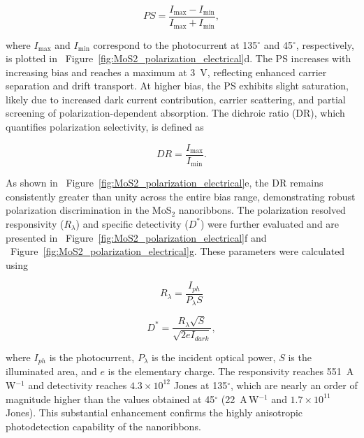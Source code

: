 \documentclass[journal=jacsnano,manuscript=article]{achemso}
\begin{document}
\begin{equation}
PS = \frac{I_{\max} - I_{\min}}{I_{\max} + I_{\min}},
\end{equation}

\noindent
where $I_{\max}$ and $I_{\min}$ correspond to the photocurrent at 135$^\circ$ and 45$^\circ$, respectively, is plotted in ~Figure~\ref{fig:MoS2_polarization_electrical}d. The PS increases with increasing bias and reaches a maximum at 3~V, reflecting enhanced carrier separation and drift transport. At higher bias, the PS exhibits slight saturation, likely due to increased dark current contribution, carrier scattering, and partial screening of polarization-dependent absorption.
The dichroic ratio (DR), which quantifies polarization selectivity, is defined as

\begin{equation}
DR = \frac{I_{\max}}{I_{\min}}.
\end{equation}

\noindent
As shown in ~Figure~\ref{fig:MoS2_polarization_electrical}e, the DR remains consistently greater than unity across the entire bias range, demonstrating robust polarization discrimination in the MoS$_2$ nanoribbons.
The polarization resolved responsivity ($R_{\lambda}$) and specific detectivity ($D^*$) were further evaluated and are presented in ~Figure~\ref{fig:MoS2_polarization_electrical}f and ~Figure~\ref{fig:MoS2_polarization_electrical}g. These parameters were calculated using

\begin{equation}
R_{\lambda} = \frac{I_{ph}}{P_{\lambda} S}
\end{equation}

\begin{equation}
D^* = \frac{R_{\lambda} \sqrt{S}}{\sqrt{2 e I_{dark}}},
\end{equation}

\noindent
where $I_{ph}$ is the photocurrent, $P_{\lambda}$ is the incident optical power, $S$ is the illuminated area, and $e$ is the elementary charge. The responsivity reaches 551~A\,W$^{-1}$ and detectivity reaches $4.3 \times 10^{12}$ Jones at 135$^\circ$, which are nearly an order of magnitude higher than the values obtained at 45$^\circ$ (22~A\,W$^{-1}$ and $1.7 \times 10^{11}$ Jones). This substantial enhancement confirms the highly anisotropic photodetection capability of the nanoribbons.
\end{document}
